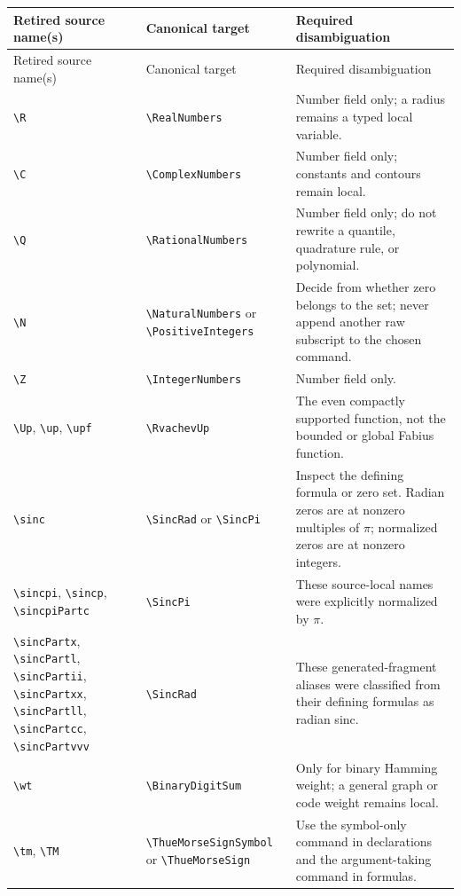 \documentclass[11pt,oneside]{article}
\theoremstyle{definition}
\theoremstyle{remark}
\DeclareRobustCommand{\commandname}[1]{\texttt{\textbackslash#1}}
\begin{document}
\begingroup\small
\begin{longtable}{@{}p{}p{}p{}@{}}
\toprule
Retired source name(s) & Canonical target & Required disambiguation\\
\midrule
\endfirsthead
\toprule
Retired source name(s) & Canonical target & Required disambiguation\\
\midrule
\endhead
\commandname{R} & \commandname{RealNumbers} & Number field only; a radius remains a
typed local variable.\\
\commandname{C} & \commandname{ComplexNumbers} & Number field only; constants and
contours remain local.\\
\commandname{Q} & \commandname{RationalNumbers} & Number field only; do not rewrite a
quantile, quadrature rule, or polynomial.\\
\commandname{N} & \commandname{NaturalNumbers} or \commandname{PositiveIntegers} & Decide
from whether zero belongs to the set; never append another raw subscript to the chosen
command.\\
\commandname{Z} & \commandname{IntegerNumbers} & Number field only.\\
\commandname{Up}, \commandname{up}, \commandname{upf} & \commandname{RvachevUp} & The
even compactly supported function, not the bounded or global Fabius function.\\
\commandname{sinc} & \commandname{SincRad} or \commandname{SincPi} & Inspect the defining
formula or zero set.  Radian zeros are at nonzero multiples of $\pi$; normalized zeros
are at nonzero integers.\\
\commandname{sincpi}, \commandname{sincp}, \commandname{sincpiPartc} &
\commandname{SincPi} & These source-local names were explicitly normalized by $\pi$.\\
\commandname{sincPartx}, \commandname{sincPartl}, \commandname{sincPartii},
\commandname{sincPartxx}, \commandname{sincPartll}, \commandname{sincPartcc},
\commandname{sincPartvvv} & \commandname{SincRad} & These generated-fragment aliases
were classified from their defining formulas as radian sinc.\\
\commandname{wt} & \commandname{BinaryDigitSum} & Only for binary Hamming weight; a
general graph or code weight remains local.\\
\commandname{tm}, \commandname{TM} & \commandname{ThueMorseSignSymbol} or
\commandname{ThueMorseSign} & Use the symbol-only command in declarations and the
argument-taking command in formulas.\\

\end{longtable}
\end{document}
